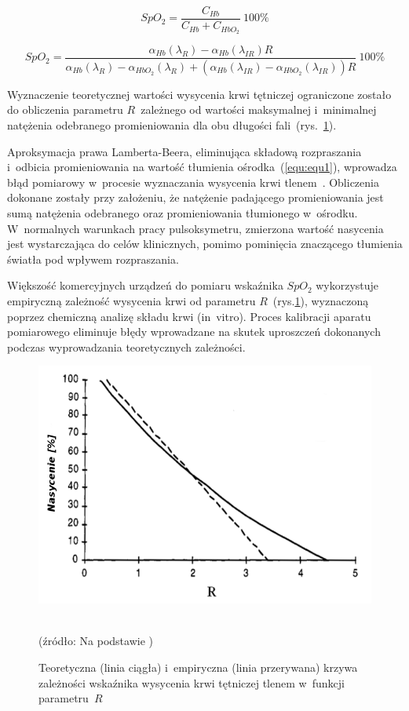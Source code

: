 \begin{equation}
\label{equ:equ4}
	SpO_{2}=\frac{C_{Hb}}{C_{Hb}+C_{HbO_{2}}}~100\%
\end{equation}

\begin{equation}
\label{equ:equ5}
	SpO_{2}=\frac{\alpha_{Hb}(\lambda_{R})-\alpha_{Hb}(\lambda_{IR})R}{\alpha_{Hb}(\lambda_{R})-\alpha_{HbO_{2}}(\lambda_{R})+(\alpha_{Hb}(\lambda_{IR})-\alpha_{HbO_{2}}(\lambda_{IR}))R}~100\%
\end{equation}

\noindent Wyznaczenie teoretycznej wartości wysycenia krwi tętniczej ograniczone zostało do obliczenia parametru $R$~zależnego od wartości maksymalnej i~minimalnej natężenia 
odebranego promieniowania dla obu długości fali~(rys.~\ref{rys:saturation}).

Aproksymacja prawa Lamberta-Beera, eliminująca składową rozpraszania i~odbicia promieniowania na wartość tłumienia ośrodka~(\ref{equ:equ1}), wprowadza błąd pomiarowy w~procesie wyznaczania wysycenia krwi 
tlenem~\cite{Web:1997}. Obliczenia dokonane zostały przy założeniu, że natężenie padającego promieniowania jest sumą natężenia odebranego oraz promieniowania tłumionego w~ośrodku. W~normalnych
warunkach pracy pulsoksymetru, zmierzona wartość nasycenia jest wystarczająca do celów klinicznych, pomimo pominięcia znaczącego tłumienia światła pod wpływem rozpraszania. 

Większość komercyjnych urządzeń do pomiaru wskaźnika $SpO_{2}$ wykorzystuje empiryczną zależność wysycenia krwi od parametru $R$~(rys.\ref{rys:saturation}), wyznaczoną poprzez chemiczną analizę 
składu krwi (in~vitro). Proces kalibracji aparatu pomiarowego eliminuje błędy wprowadzane na skutek uproszczeń dokonanych podczas wyprowadzania teoretycznych zależności.
\begin{figure}[ht]
\centerline{\includegraphics[scale = 0.52]{graphic/saturation.png}}
	\caption{Teoretyczna (linia ciągła) i~empiryczna (linia przerywana) krzywa zależności wskaźnika wysycenia krwi tętniczej tlenem w~funkcji parametru~$R$}
	\label{rys:saturation}
	~\\
	(źródło: Na podstawie \cite{Dwyer:2008})
\end{figure}

